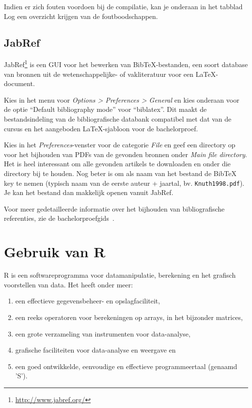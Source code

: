 Indien er zich fouten voordoen bij de compilatie, kan je onderaan in het tabblad Log een overzicht krijgen van de foutboodschappen.

\subsection{JabRef}

JabRef\footnote{\url{http://www.jabref.org/}} is een GUI voor het bewerken van Bib\TeX{}-bestanden, een soort database van bronnen uit de wetenschappelijke- of vakliteratuur voor een \LaTeX{}-document.

Kies in het menu voor \emph{Options > Preferences > General} en kies onderaan voor de optie ``Default bibliography mode'' voor ``biblatex''. Dit maakt de bestandsindeling van de bibliografische databank compatibel met dat van de cursus en het aangeboden \LaTeX{}-sjabloon voor de bachelorproef.

Kies in het \emph{Preferences}-venster voor de categorie \emph{File} en geef een directory op voor het bijhouden van PDFs van de gevonden bronnen onder \emph{Main file directory}. Het is heel interessant om alle gevonden artikels te downloaden en onder die directory bij te houden. Nog beter is om als naam van het bestand de Bib\TeX{} key te nemen (typisch naam van de eerste auteur + jaartal, bv. \texttt{Knuth1998.pdf}). Je kan het bestand dan makkelijk openen vanuit JabRef.

Voor meer gedetailleerde informatie over het bijhouden van bibliografische referenties, zie de bachelorproefgids~\autocite{VanVreckem2017}.


\section{Gebruik van R}

R is een softwareprogramma voor datamanipulatie, berekening en het grafisch voorstellen van data. Het heeft onder meer:

\begin{enumerate}
  \item een effectieve gegevensbeheer- en opslagfaciliteit,
  \item een reeks operatoren voor berekeningen op arrays, in het bijzonder matrices,
  \item een grote verzameling van instrumenten voor data-analyse,
  \item grafische faciliteiten voor data-analyse en weergave en
  \item een goed ontwikkelde, eenvoudige en effectieve programmeertaal (genaamd 'S').
\end{enumerate}

